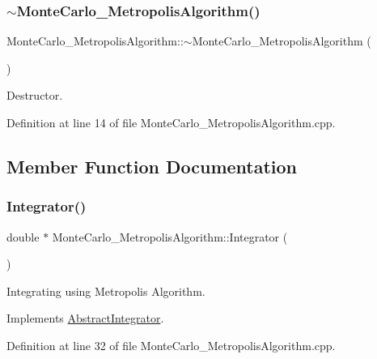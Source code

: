 \subsubsection{\texorpdfstring{$\sim$\+Monte\+Carlo\+\_\+\+Metropolis\+Algorithm()}{~MonteCarlo\_MetropolisAlgorithm()}}
{\footnotesize\ttfamily Monte\+Carlo\+\_\+\+Metropolis\+Algorithm\+::$\sim$\+Monte\+Carlo\+\_\+\+Metropolis\+Algorithm (\begin{DoxyParamCaption}{ }\end{DoxyParamCaption})}



Destructor. 



Definition at line 14 of file Monte\+Carlo\+\_\+\+Metropolis\+Algorithm.\+cpp.



\subsection{Member Function Documentation}
\mbox{\label{class_monte_carlo___metropolis_algorithm_a93fba72a50330bf184156e23158992b2}} 
\subsubsection{\texorpdfstring{Integrator()}{Integrator()}}
{\footnotesize\ttfamily double $\ast$ Monte\+Carlo\+\_\+\+Metropolis\+Algorithm\+::\+Integrator (\begin{DoxyParamCaption}{ }\end{DoxyParamCaption})\hspace{0.3cm}{\ttfamily [virtual]}}



Integrating using Metropolis Algorithm. 



Implements \hyperlink{class_abstract_integrator_a073d8f87239f732b3d2832070caa3b17}{Abstract\+Integrator}.



Definition at line 32 of file Monte\+Carlo\+\_\+\+Metropolis\+Algorithm.\+cpp.

\mbox{\label{class_monte_carlo___metropolis_algorithm_ac19d55a838561eaecea3ea519de7e091}} 
